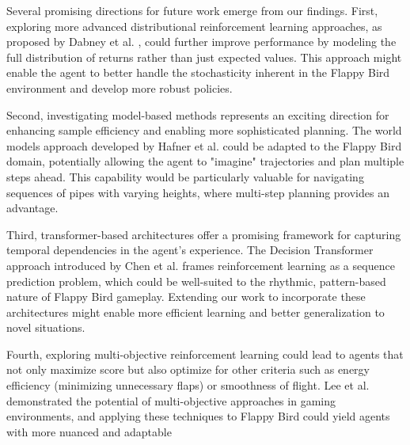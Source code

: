 Several promising directions for future work emerge from our findings. First, exploring more advanced distributional reinforcement learning approaches, as proposed by Dabney et al. \cite{dabney2020distributional}, could further improve performance by modeling the full distribution of returns rather than just expected values. This approach might enable the agent to better handle the stochasticity inherent in the Flappy Bird environment and develop more robust policies.

Second, investigating model-based methods represents an exciting direction for enhancing sample efficiency and enabling more sophisticated planning. The world models approach developed by Hafner et al. \cite{hafner2023mastering} could be adapted to the Flappy Bird domain, potentially allowing the agent to "imagine" trajectories and plan multiple steps ahead. This capability would be particularly valuable for navigating sequences of pipes with varying heights, where multi-step planning provides an advantage.

Third, transformer-based architectures offer a promising framework for capturing temporal dependencies in the agent's experience. The Decision Transformer approach introduced by Chen et al. \cite{chen2021decision} frames reinforcement learning as a sequence prediction problem, which could be well-suited to the rhythmic, pattern-based nature of Flappy Bird gameplay. Extending our work to incorporate these architectures might enable more efficient learning and better generalization to novel situations.

Fourth, exploring multi-objective reinforcement learning could lead to agents that not only maximize score but also optimize for other criteria such as energy efficiency (minimizing unnecessary flaps) or smoothness of flight. Lee et al. \cite{lee2022multi} demonstrated the potential of multi-objective approaches in gaming environments, and applying these techniques to Flappy Bird could yield agents with more nuanced and adaptable